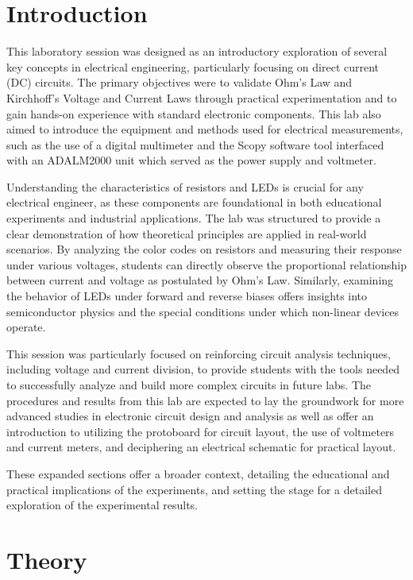 \documentclass[12pt]{article}
\begin{document}
\section{Introduction}
This laboratory session was designed as an introductory exploration of several
key concepts in electrical engineering, particularly focusing on direct current
(DC) circuits. The primary objectives were to validate Ohm's Law and Kirchhoff's
Voltage and Current Laws through practical experimentation and to gain hands-on
experience with standard electronic components. This lab also aimed to introduce
the equipment and methods used for electrical measurements, such as the use of a
digital multimeter and the Scopy software tool interfaced with an ADALM2000 unit
which served as the power supply and voltmeter.

Understanding the characteristics of resistors and LEDs is crucial for any
electrical engineer, as these components are foundational in both educational
experiments and industrial applications. The lab was structured to provide a
clear demonstration of how theoretical principles are applied in real-world
scenarios. By analyzing the color codes on resistors and measuring their
response under various voltages, students can directly observe the proportional
relationship between current and voltage as postulated by Ohm’s Law. Similarly,
examining the behavior of LEDs under forward and reverse biases offers insights
into semiconductor physics and the special conditions under which non-linear
devices operate.

This session was particularly focused on reinforcing circuit analysis
techniques, including voltage and current division, to provide students with the
tools needed to successfully analyze and build more complex circuits in future
labs. The procedures and results from this lab are expected to lay the
groundwork for more advanced studies in electronic circuit design and analysis
as well as offer an introduction to utilizing the protoboard for circuit layout,
the use of voltmeters and current meters, and deciphering an electrical
schematic for practical layout.

These expanded sections offer a broader context, detailing the educational and
practical implications of the experiments, and setting the stage for a detailed
exploration of the experimental results.
\section{Theory}
\end{document}
